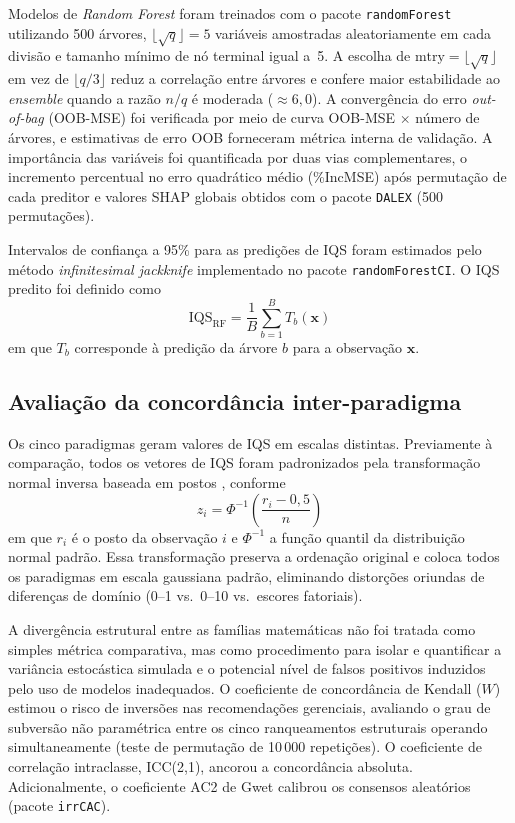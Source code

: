 \documentclass[pdflatex,sn-basic]{sn-jnl}%
\begin{document}
Modelos de \textit{Random Forest} foram treinados com o pacote \texttt{randomForest} utilizando 500 árvores, $\lfloor \sqrt{q} \rfloor = 5$ variáveis amostradas aleatoriamente em cada divisão e tamanho mínimo de nó terminal igual a~5. A escolha de $\text{mtry} = \lfloor \sqrt{q} \rfloor$ em vez de $\lfloor q/3 \rfloor$ reduz a correlação entre árvores e confere maior estabilidade ao \textit{ensemble} quando a razão $n/q$ é moderada ($\approx 6{,}0$). A convergência do erro \textit{out-of-bag} (OOB-MSE) foi verificada por meio de curva OOB-MSE $\times$ número de árvores, e estimativas de erro OOB forneceram métrica interna de validação. A importância das variáveis foi quantificada por duas vias complementares, o incremento percentual no erro quadrático médio (\%IncMSE) após permutação de cada preditor e valores SHAP globais obtidos com o pacote \texttt{DALEX} (500 permutações). 

Intervalos de confiança a 95\% para as predições de IQS foram estimados pelo método \textit{infinitesimal jackknife} implementado no pacote \texttt{randomForestCI}. O IQS predito foi definido como
\begin{equation}
\text{IQS}_{\text{RF}} = \frac{1}{B}\sum_{b=1}^{B} T_b(\mathbf{x})
\label{eq:rf}
\end{equation}
em que $T_b$ corresponde à predição da árvore $b$ para a observação $\mathbf{x}$.

\subsection{Avaliação da concordância inter-paradigma}\label{subsec:concordance}

Os cinco paradigmas geram valores de IQS em escalas distintas. Previamente à comparação, todos os vetores de IQS foram padronizados pela transformação normal inversa baseada em postos \cite{Blom1958}, conforme
\begin{equation}
z_i = \Phi^{-1}\!\left(\frac{r_i - 0{,}5}{n}\right)
\label{eq:blom}
\end{equation}
em que $r_i$ é o posto da observação $i$ e $\Phi^{-1}$ a função quantil da distribuição normal padrão. Essa transformação preserva a ordenação original e coloca todos os paradigmas em escala gaussiana padrão, eliminando distorções oriundas de diferenças de domínio (0--1 vs.\ 0--10 vs.\ escores fatoriais).

A divergência estrutural entre as famílias matemáticas não foi tratada como simples métrica comparativa, mas como procedimento para isolar e quantificar a variância estocástica simulada e o potencial nível de falsos positivos induzidos pelo uso de modelos inadequados. O coeficiente de concordância de Kendall ($W$) estimou o risco de inversões nas recomendações gerenciais, avaliando o grau de subversão não paramétrica entre os cinco ranqueamentos estruturais operando simultaneamente (teste de permutação de 10\,000 repetições). O coeficiente de correlação intraclasse, ICC(2,1), ancorou a concordância absoluta. Adicionalmente, o coeficiente AC2 de Gwet \cite{Gwet2008} calibrou os consensos aleatórios (pacote \texttt{irrCAC}). 
\end{document}
